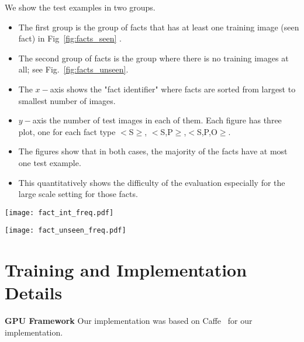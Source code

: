 \documentclass[runningheads]{llncs}
\begin{document}
We show the test examples in two groups.

\begin{itemize}
	\item The first group is the group of facts that has at least one training image (seen fact) in Fig~\ref{fig:facts_seen} .
\item The second group of facts is the group where there is no training images at all; see Fig.~\ref{fig:facts_unseen}.
\item The $x-$axis  shows the "fact identifier" where facts are sorted from largest to smallest number of images.
\item $y-$axis the number of test images in each of them. Each figure has three plot, one for each fact type $<$S$\ge$, $<$S,P$\ge$,$<$S,P,O$\ge$.
\item The figures show that  in both cases, the majority of the facts have at most one test example.
\item This quantitatively shows the difficulty of the evaluation especially for the large scale setting for those facts.
\end{itemize}







\begin{figure*}[ht!]
  \centering
    \texttt{[image: fact\_int\_freq.pdf]}

     \caption{26,740 unique test facts that have at least one training example (seen facts), total of 136,040  images ($x-$ axis shows these facts, $y-$ axis shows the number of test images per each fact)}
     \label{fig:facts_seen}
\end{figure*}
\begin{figure*}[ht!]
  \centering
    \texttt{[image: fact\_unseen\_freq.pdf]}
     \caption{31,677 unique unseen test facts, total of 32,651 images ($x-$ axis shows  these facts, $y-$ axis shows the number of test images per each fact)}
     \label{fig:facts_unseen}
\end{figure*}








\clearpage
\section{Training and Implementation Details}
\textbf{GPU Framework} Our implementation was based on Caffe~\cite{jia2014caffe} for our implementation.
\end{document}
